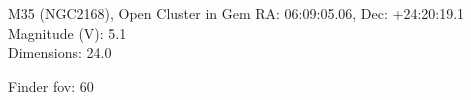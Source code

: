 \begin{block}{M35 (NGC2168), Open Cluster in Gem}
    RA: 06:09:05.06, Dec: +24:20:19.1 \\ 
    Magnitude (V): 5.1 \\ 
    Dimensions: 24.0 

    Finder fov: 60 
\end{block}